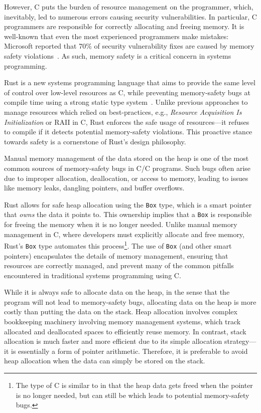 \documentclass[en]{snu-ece-bsc-thesis}
\theoremstyle{definition}
\def\cplus{\raisebox{.4ex}{\relsize{-3}{\texttt{+}}}}
\def\C++{C\nolinebreak\hspace{-.081em}\cplus\nolinebreak\hspace{-0.02em}\cplus}
\begin{document}
However, C puts the burden of resource management on the programmer, which, inevitably, led to numerous errors causing security vulnerabilities.
In particular, C programmers are responsible for correctly allocating and freeing memory.
It is well-known that even the most experienced programmers make mistakes: Microsoft reported that 70\% of security vulnerability fixes are caused by memory safety violations~\cite{thomas:19}.
As such, memory safety is a critical concern in systems programming.

Rust is a new systems programming language that aims to provide the same level of control over low-level resources as C, while preventing memory-safety bugs at compile time using a strong static type system~\cite{rustbook}.
Unlike previous approaches to manage resources which relied on best-practices, e.g., \emph{Resource Acquisition Is Initialization} or RAII in \C++, Rust enforces the safe usage of resources---it refuses to compile if it detects potential memory-safety violations.
This proactive stance towards safety is a cornerstone of Rust's design philosophy.

Manual memory management of the data stored on the heap is one of the most common sources of memory-safety bugs in C/\C++{} programs.
Such bugs often arise due to improper allocation, deallocation, or access to memory, leading to issues like memory leaks, dangling pointers, and buffer overflows.

Rust allows for safe heap allocation using the \verb/Box/ type, which is a smart pointer that \emph{owns} the data it points to.
This ownership implies that a \verb/Box/ is responsible for freeing the memory when it is no longer needed.
Unlike manual memory management in C, where developers must explicitly allocate and free memory, Rust's \verb/Box/ type automates this process\footnote{The  type of \C++{} is similar to  in that the heap data gets freed when the pointer is no longer needed, but  can still be  which leads to potential memory-safety bugs.}.
The use of \verb/Box/ (and other smart pointers) encapsulates the details of memory management, ensuring that resources are correctly managed, and prevent many of the common pitfalls encountered in traditional systems programming using C.

While it is always safe to allocate data on the heap, in the sense that the program will not lead to memory-safety bugs, allocating data on the heap is more costly than putting the data on the stack.
Heap allocation involves complex bookkeeping machinery involving memory management systems, which track allocated and deallocated spaces to efficiently reuse memory.
In contrast, stack allocation is much faster and more efficient due to its simple allocation strategy---it is essentially a form of pointer arithmetic.
Therefore, it is preferable to avoid heap allocation when the data can simply be stored on the stack.
\end{document}
